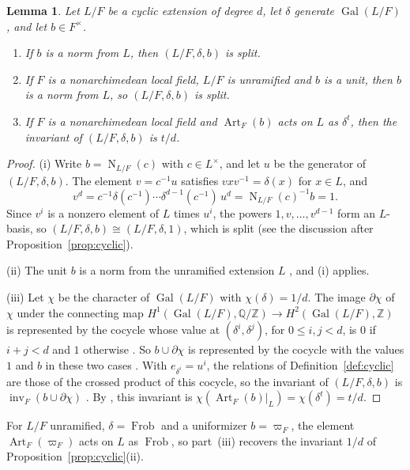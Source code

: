 \documentclass[a4paper,11pt]{amsart}
\newtheorem{lemma}[theorem]{Lemma}
\theoremstyle{definition}
\theoremstyle{remark}
\numberwithin{equation}{section}
\newcommand{\Q}{\mathbb{Q}}
\newcommand{\Z}{\mathbb{Z}}
\DeclareMathOperator{\inv}{inv}
\DeclareMathOperator{\Gal}{Gal}
\DeclareMathOperator{\Frob}{Frob}
\DeclareMathOperator{\Art}{Art}
\DeclareMathOperator{\Nm}{N}
\begin{document}
\begin{lemma}\label{lem:cyclic-split-invariant}
Let $L/F$ be a cyclic extension of degree $d$, let $\delta$ generate $\Gal(L/F)$, and let $b\in F^\times$.
\begin{enumerate}
\item[(i)] If $b$ is a norm from $L$, then $(L/F,\delta,b)$ is split.
\item[(ii)] If $F$ is a nonarchimedean local field, $L/F$ is unramified and $b$ is a unit, then $b$ is a norm from $L$, so $(L/F,\delta,b)$ is split.
\item[(iii)] If $F$ is a nonarchimedean local field and $\Art_F(b)$ acts on $L$ as $\delta^t$, then the invariant of $(L/F,\delta,b)$ is $t/d$.
\end{enumerate}
\end{lemma}

\begin{proof}
(i) Write $b=\Nm_{L/F}(c)$ with $c\in L^\times$, and let $u$ be the generator of $(L/F,\delta,b)$. The element $v=c^{-1}u$ satisfies $vxv^{-1}=\delta(x)$ for $x\in L$, and
\[
 v^d=c^{-1}\delta(c^{-1})\cdots\delta^{d-1}(c^{-1})\,u^d =\Nm_{L/F}(c)^{-1}b=1.
\]
Since $v^i$ is a nonzero element of $L$ times $u^i$, the powers $1,v,\dots,v^{d-1}$ form an $L$-basis, so $(L/F,\delta,b)\cong(L/F,\delta,1)$, which is split (see the discussion after Proposition~\ref{prop:cyclic}).

(ii) The unit $b$ is a norm from the unramified extension $L$ \cite[I, 1.9 and Theorem~1.1(b)]{Mil20}, and (i) applies.

(iii) Let $\chi$ be the character of $\Gal(L/F)$ with $\chi(\delta)=1/d$. The image $\partial\chi$ of $\chi$ under the connecting map $H^1(\Gal(L/F),\Q/\Z)\to H^2(\Gal(L/F),\Z)$ is represented by the cocycle whose value at $(\delta^i,\delta^j)$, for $0\le i,j<d$, is $0$ if $i+j<d$ and $1$ otherwise \cite[III, \S1, before Proposition~1.9]{Mil20}. So $b\cup\partial\chi$ is represented by the cocycle with the values $1$ and $b$ in these two cases \cite[III, before Proposition~3.6]{Mil20}. With $e_{\delta^i}=u^i$, the relations of Definition~\ref{def:cyclic} are those of the crossed product of this cocycle, so the invariant of $(L/F,\delta,b)$ is $\inv_F(b\cup\partial\chi)$ \cite[IV, Theorem~3.14, Corollary~3.16 and Remark~4.4(a)]{Mil20}. By \cite[III, Proposition~3.6]{Mil20}, this invariant is $\chi(\Art_F(b)|_L)=\chi(\delta^t)=t/d$.
\end{proof}

For $L/F$ unramified, $\delta=\Frob$ and a uniformizer $b=\varpi_F$, the element $\Art_F(\varpi_F)$ acts on $L$ as $\Frob$, so part~(iii) recovers the invariant $1/d$ of Proposition~\ref{prop:cyclic}(ii).
\end{document}
